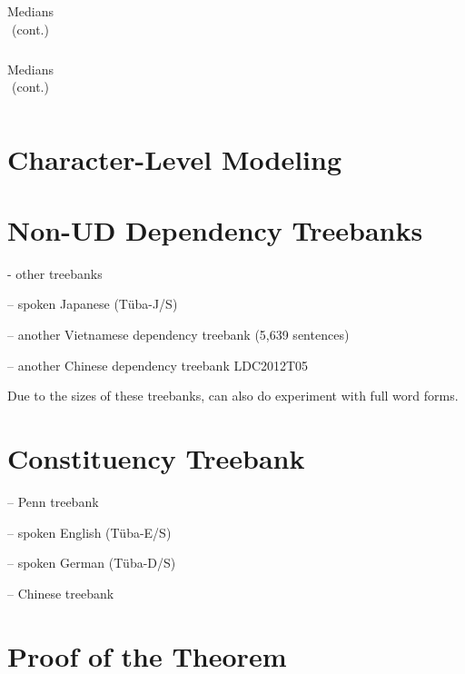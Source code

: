 \documentclass[11pt,letterpaper]{article}
\begin{document}
\begin{table}
\begin{longtable}{ccccccccccccccclll}

\end{longtable}
	\caption{Medians (cont.)}
\end{table}

\begin{table}
\begin{longtable}{ccccccccccccccclll}

\end{longtable}
	\caption{Medians (cont.)}
\end{table}


\section{Character-Level Modeling}

\section{Non-UD Dependency Treebanks}



- other treebanks



-- spoken Japanese (T{\"u}ba-J/S)

-- another Vietnamese dependency treebank \citep{nguyen-bktreebank:-2017} (5,639 sentences)


-- another Chinese dependency treebank LDC2012T05


Due to the sizes of these treebanks, can also do experiment with full word forms.


\section{Constituency Treebank}

-- Penn treebank \citep{marcus-building-1993}

-- spoken English (T{\"u}ba-E/S)

-- spoken German (T{\"u}ba-D/S)

-- Chinese treebank \citep{xue-chinese-2013}


\section{Proof of the Theorem}
\end{document}
